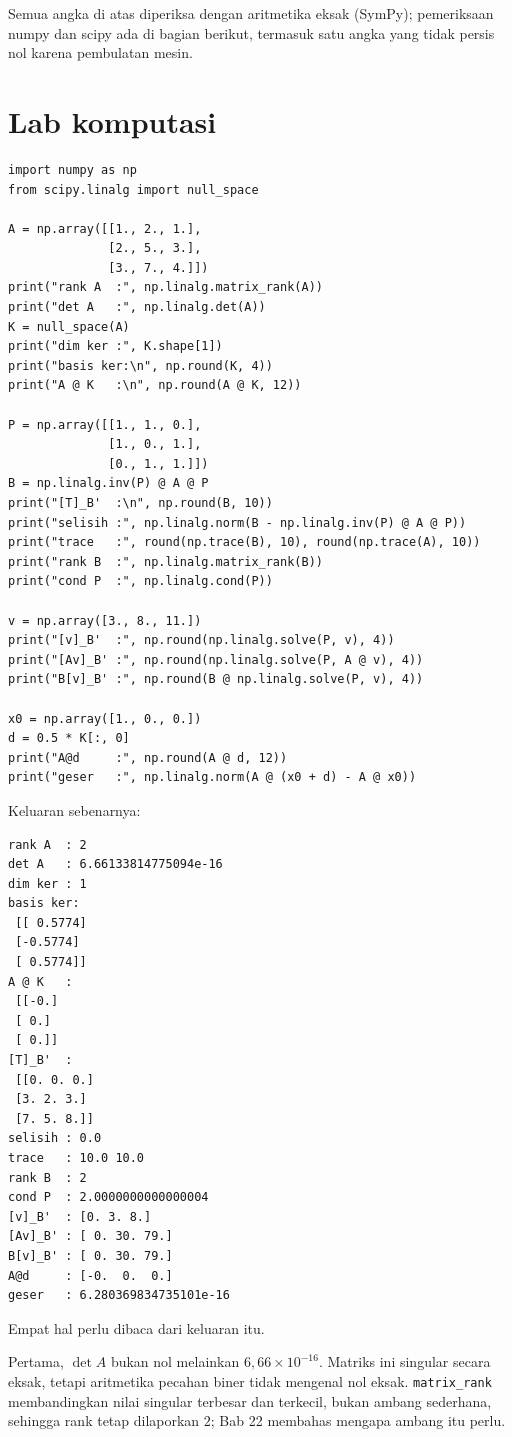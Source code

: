 Semua angka di atas diperiksa dengan aritmetika eksak (SymPy); pemeriksaan numpy dan
scipy ada di bagian berikut, termasuk satu angka yang tidak persis nol karena pembulatan
mesin.

\section{Lab komputasi}

\begin{lab}
\begin{verbatim}
import numpy as np
from scipy.linalg import null_space

A = np.array([[1., 2., 1.],
              [2., 5., 3.],
              [3., 7., 4.]])
print("rank A  :", np.linalg.matrix_rank(A))
print("det A   :", np.linalg.det(A))
K = null_space(A)
print("dim ker :", K.shape[1])
print("basis ker:\n", np.round(K, 4))
print("A @ K   :\n", np.round(A @ K, 12))

P = np.array([[1., 1., 0.],
              [1., 0., 1.],
              [0., 1., 1.]])
B = np.linalg.inv(P) @ A @ P
print("[T]_B'  :\n", np.round(B, 10))
print("selisih :", np.linalg.norm(B - np.linalg.inv(P) @ A @ P))
print("trace   :", round(np.trace(B), 10), round(np.trace(A), 10))
print("rank B  :", np.linalg.matrix_rank(B))
print("cond P  :", np.linalg.cond(P))

v = np.array([3., 8., 11.])
print("[v]_B'  :", np.round(np.linalg.solve(P, v), 4))
print("[Av]_B' :", np.round(np.linalg.solve(P, A @ v), 4))
print("B[v]_B' :", np.round(B @ np.linalg.solve(P, v), 4))

x0 = np.array([1., 0., 0.])
d = 0.5 * K[:, 0]
print("A@d     :", np.round(A @ d, 12))
print("geser   :", np.linalg.norm(A @ (x0 + d) - A @ x0))
\end{verbatim}
Keluaran sebenarnya:
\begin{verbatim}
rank A  : 2
det A   : 6.66133814775094e-16
dim ker : 1
basis ker:
 [[ 0.5774]
 [-0.5774]
 [ 0.5774]]
A @ K   :
 [[-0.]
 [ 0.]
 [ 0.]]
[T]_B'  :
 [[0. 0. 0.]
 [3. 2. 3.]
 [7. 5. 8.]]
selisih : 0.0
trace   : 10.0 10.0
rank B  : 2
cond P  : 2.0000000000000004
[v]_B'  : [0. 3. 8.]
[Av]_B' : [ 0. 30. 79.]
B[v]_B' : [ 0. 30. 79.]
A@d     : [-0.  0.  0.]
geser   : 6.280369834735101e-16
\end{verbatim}
\end{lab}

Empat hal perlu dibaca dari keluaran itu.

Pertama, $\det A$ bukan nol melainkan $6{,}66\times10^{-16}$. Matriks ini singular
secara eksak, tetapi aritmetika pecahan biner tidak mengenal nol eksak.
\texttt{matrix\_rank} membandingkan nilai singular terbesar dan terkecil, bukan ambang
sederhana, sehingga rank tetap dilaporkan $2$; Bab 22 membahas mengapa ambang itu perlu.

